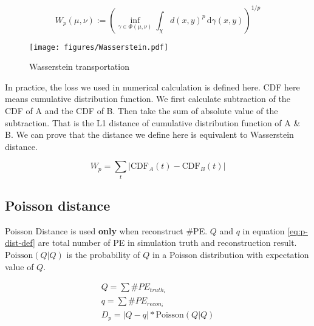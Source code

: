 \label{sub:Wasserstein distance}
    \begin{equation}
        W_{p}(\mu,\nu):=\left(\inf_{\gamma\in\Phi(\mu,\nu)}\int_{\chi}d(x,y)^{p}\,\mathrm{d}\gamma(x,y)\right)^{1/p}
        \label{eq:w-dist-def}
    \end{equation}
    \begin{figure}[H]
        \centering
            \texttt{[image: figures/Wasserstein.pdf]}
        \caption{Wasserstein transportation}
        \label{fig:Wasserstein transportation}
    \end{figure}

In practice, the loss we used in numerical calculation is defined here. CDF here means cumulative distribution function. We first calculate subtraction of the CDF of A and the CDF of B. Then take the sum of absolute value of the subtraction. That is the L1 distance of cumulative distribution function of A \& B. We can prove that the distance we define here is equivalent to Wasserstein distance. 

\begin{equation}
    W_{p}=\sum_t|\mathrm{CDF}_A(t) - \mathrm{CDF}_B(t)|
\end{equation}

\subsection{Poisson distance}
Poisson Distance is used \textbf{only} when reconstruct \#PE. $Q$ and $q$ in equation \ref{eq:p-dist-def} are total number of PE in simulation truth and reconstruction result. $\mathrm{Poisson}(Q|Q)$ is the probability of $Q$ in a Poisson distribution with expectation value of $Q$. 

\label{sub:Poisson distance}
    \begin{align}
        Q = \sum \#PE_{truth_i} \\
        q = \sum \#PE_{recon_i} \\
        D_{p} = |Q-q|*\mathrm{Poisson}(Q|Q)
        \label{eq:p-dist-def}
    \end{align}

